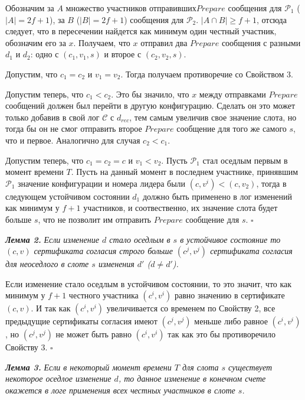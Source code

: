 Обозначим за $A$ множество участников отправивших$Prepare$ сообщения для  $\mathcal{P}_1$ ($|A|=2f+1$), за $B$ ($|B|=2f+1$) сообщения для $\mathcal{P}_2$. $|A \cap B| \ge f+1$, отсюда следует, что в пересечении найдется как минимум один честный участник,  обозначим его за $x$. Получаем, что $x$ отправил два $Prepare$ сообщения с разными $d_1$ и $d_2$: одно с $(c_1, v_1, s)$ и второе с $(c_2, v_2, s)$.

Допустим, что $c_1 = c_2$ и  $v_1 = v_2$. Тогда получаем противоречие со Свойством 3.

Допустим теперь, что $c_1 < c_2$. Это бы значило, что $x$ между отправками $Prepare$ сообщений должен был перейти в другую конфигурацию. Сделать он это может только добавив в свой лог $\mathcal{C}$ с $d_{rec}$, тем самым увеличив свое значение слота, но тогда бы он не смог отправить второе $Prepare$ сообщение для того же самого $s$, что и первое. Аналогично для случая $c_2 < c_1$.

Допустим теперь, что $c_1=c_2=c$ и $v_1 < v_2$. Пусть $\mathcal{P}_1$ стал оседлым первым в момент времени  $T$. Пусть на данный момент в последнем участнике, принявшим $\mathcal{P}_1$ значение конфигурации и номера лидера были $(c, v^i) < (c, v_2)$, тогда в следующем устойчивом состоянии $d_1$ должно быть применено в лог изменений как минимум у $f+1$ участников, и соотвественно, их значение слота будет больше $s$, что не позволит им отправить $Prepare$ сообщение для $s$. $\square$
\vspace{10pt}

\textbf{\textit{Лемма 2.}} \textit{Если изменение $d$ стало оседлым в $s$ в устойчивое состояние то $(c, v)$ сертификата согласия строго больше $(c^j, v^j)$ сертификата согласия для неоседлого в слоте $s$ изменения $d'$ ($d \ne d'$).}

Если изменение стало оседлым в устойчивом состоянии, то это значит, что как минимум у $f+1$ честного участника $(c^i, v^i)$ равно значению в сертификате $(c, v)$. И так как $(c^i, v^i)$ увеличивается со временем по Свойству 2, все предыдущие сертификаты согласия имеют $(c^j, v^j)$ меньше либо равное $(c^i, v^i)$, но $(c^j, v^j)$ не может быть равно $(c^i, v^i)$ так как это бы противоречило Свойству 3.
$\square$
\vspace{10pt}

\textbf{\textit{Лемма 3.}} \textit{Если в некоторый момент времени $T$ для слота $s$ существует некоторое оседлое изменение $d$, то данное изменение в конечном счете окажется в логе применения всех честных участников в слоте $s$.}

